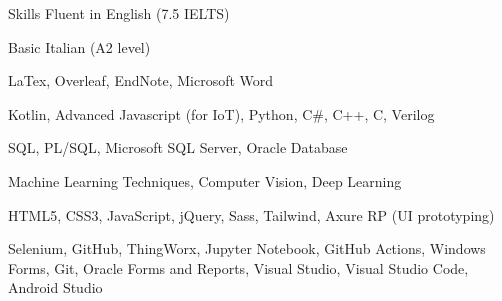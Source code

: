 
\begin{rubric}{Skills}
\entry*[Languages]
	Fluent in English (7.5 IELTS)
    
    Basic Italian (A2 level)

\entry*[Research]
    LaTex,
    Overleaf,
    EndNote,
    Microsoft Word

	Kotlin,
    Advanced Javascript (for IoT),
    Python,
    C\#,
    C++,
    C,
    Verilog

\entry*[Databases]
    SQL,
    PL/SQL,
	Microsoft SQL Server,
    Oracle Database

\entry*[AI]
    Machine Learning Techniques,
    Computer Vision,
    Deep Learning

	HTML5,
    CSS3,
    JavaScript,
    jQuery,
    Sass,
    Tailwind,
    Axure RP (UI prototyping)

    Selenium,
    GitHub,
    ThingWorx,
    Jupyter Notebook,
    GitHub Actions,
	Windows Forms,
    Git,
    Oracle Forms and Reports,
    Visual Studio,
    Visual Studio Code,
    Android Studio


\end{rubric}

